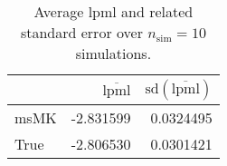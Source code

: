 \begin{table}[H]

\caption{Average lpml and related standard error over $n_{\text{sim}} = 10$ simulations.}
\centering
\begin{tabular}[t]{lrr}
\toprule
  & $\overbar{\text{lpml}}$ & $\text{sd}(\overbar{\text{lpml}})$\\
\midrule
msMK & -2.831599 & 0.0324495\\
True & -2.806530 & 0.0301421\\
\bottomrule
\end{tabular}
\end{table}